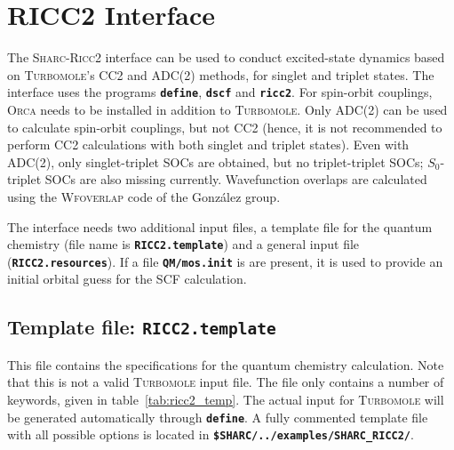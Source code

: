 \documentclass[a4paper,10pt,DIV=15,openany,twoside=false]{scrbook}
\newcommand{\sharc}{\textsc{Sharc}}
\newcommand{\ttt}[1]{\textbf{\texttt{#1}}}
\begin{document}
\section{RICC2 Interface}\label{sec:int:ricc2}

The \sharc-\textsc{Ricc2} interface can be used to conduct excited-state dynamics based on \textsc{Turbomole}'s CC2 and ADC(2) methods, for singlet and triplet states.
The interface uses the programs \ttt{define}, \ttt{dscf} and \ttt{ricc2}.
For spin-orbit couplings, \textsc{Orca} needs to be installed in addition to \textsc{Turbomole}.
Only ADC(2) can be used to calculate spin-orbit couplings, but not CC2 (hence, it is not recommended to perform CC2 calculations with both singlet and triplet states).
Even with ADC(2), only singlet-triplet SOCs are obtained, but no triplet-triplet SOCs; $S_0$-triplet SOCs are also missing currently.
Wavefunction overlaps are calculated using the \textsc{Wfoverlap} code of the Gonz\'alez group.\cite{Plasser2016JCTC}

The interface needs two additional input files, a template file for the quantum chemistry (file name is \ttt{RICC2.template}) and a general input file (\ttt{RICC2.resources}). 
If a file \ttt{QM/mos.init} is are present, it is used to provide an initial orbital guess for the SCF calculation.


\subsection{Template file: \ttt{RICC2.template}}

This file contains the specifications for the quantum chemistry calculation. Note that this is not a valid \textsc{Turbomole} input file. The file only contains a number of keywords, given in table~\ref{tab:ricc2_temp}. The actual input for \textsc{Turbomole} will be generated automatically through \ttt{define}.
A fully commented template file with all possible options is located in \ttt{\$SHARC/../examples/SHARC\_RICC2/}.
\end{document}
